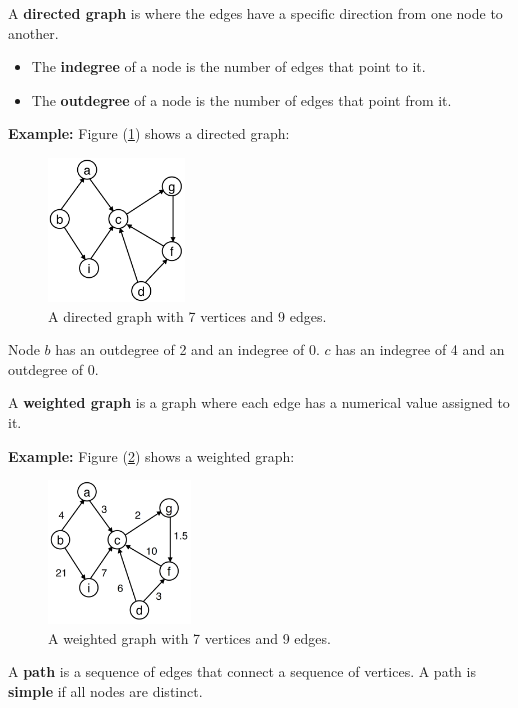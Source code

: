 \begin{Def}

    A \textbf{directed graph} is where the edges have a specific direction from one node to another.
    \begin{itemize}
        \item  The \textbf{indegree} of a node is the number of edges that point to it.
        \item The \textbf{outdegree} of a node is the number of edges that point from it.
    \end{itemize}
\end{Def}
\noindent
\textbf{Example:} Figure (\ref{fig:dir_graph}) shows a directed graph:\\
\begin{figure}[h]
    \begin{center}
      \includegraphics[height=1.5in]{./Sections/graphs/dir_graph.png}
    \end{center}
     \caption{A directed graph with 7 vertices and 9 edges.}\label{fig:dir_graph}
  \end{figure}

  \noindent
    Node $b$ has an outdegree of 2 and an indegree of 0. $c$ has an indegree of 4 and an outdegree of 0.

\begin{Def}

    A \textbf{weighted graph} is a graph where each edge has a numerical value assigned to it.
\end{Def}
\noindent
\textbf{Example:} Figure (\ref{fig:weight_graph}) shows a weighted graph:\\
\begin{figure}[h]
    \begin{center}
      \includegraphics[height=1.5in]{./Sections/graphs/weight_graph.png}
    \end{center}
     \caption{A weighted graph with 7 vertices and 9 edges.}\label{fig:weight_graph}
  \end{figure}
\newpage
\begin{Def}[Path]

    A \textbf{path} is a sequence of edges that connect a sequence of vertices. A 
    path is \textbf{simple} if all nodes are distinct.
\end{Def}

